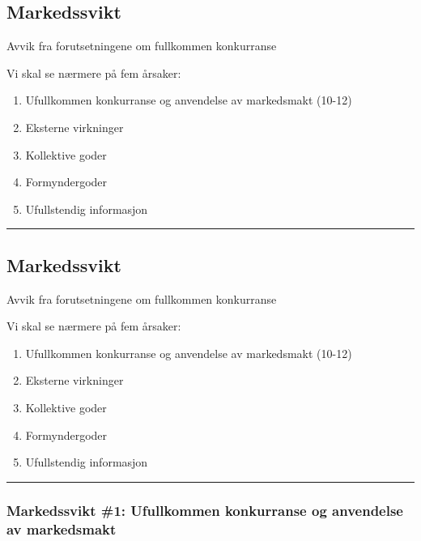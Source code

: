 \documentclass[
  letterpaper,
  DIV=11,
  numbers=noendperiod]{scrartcl}
\providecommand{\tightlist}{%
  \setlength{\itemsep}{0pt}\setlength{\parskip}{0pt}}\usepackage{longtable,booktabs,array}
\begin{document}
\subsection{Markedssvikt}\label{markedssvikt}

Avvik fra forutsetningene om fullkommen konkurranse

Vi skal se nærmere på fem årsaker:

\begin{enumerate}
\def\labelenumi{\arabic{enumi}.}
\tightlist
\item
  Ufullkommen konkurranse og anvendelse av markedsmakt (10-12)
\item
  Eksterne virkninger
\item
  Kollektive goder
\item
  Formyndergoder
\item
  Ufullstendig informasjon
\end{enumerate}

\begin{center}\rule{0.5\linewidth}{0.5pt}\end{center}

\subsection{Markedssvikt}\label{markedssvikt-1}

Avvik fra forutsetningene om fullkommen konkurranse

Vi skal se nærmere på fem årsaker:

\begin{enumerate}
\def\labelenumi{\arabic{enumi}.}
\tightlist
\item
  Ufullkommen konkurranse og anvendelse av markedsmakt (10-12)
\item
  Eksterne virkninger
\item
  Kollektive goder
\item
  Formyndergoder
\item
  Ufullstendig informasjon
\end{enumerate}

\begin{center}\rule{0.5\linewidth}{0.5pt}\end{center}

\subsubsection{Markedssvikt \#1: Ufullkommen konkurranse og anvendelse
av
markedsmakt}\label{markedssvikt-1-ufullkommen-konkurranse-og-anvendelse-av-markedsmakt}
\end{document}
